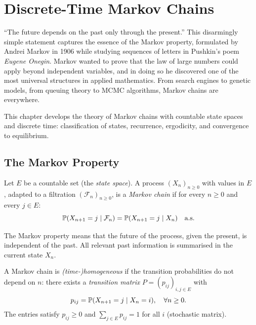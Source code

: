 \chapter{Discrete-Time Markov Chains}
\label{ch:discrete_markov}

``The future depends on the past only through the present.'' This disarmingly simple statement captures the essence of the Markov property, formulated by Andrei Markov in 1906 while studying sequences of letters in Pushkin's poem \emph{Eugene Onegin}. Markov wanted to prove that the law of large numbers could apply beyond independent variables, and in doing so he discovered one of the most universal structures in applied mathematics. From search engines to genetic models, from queuing theory to MCMC algorithms, Markov chains are everywhere.

This chapter develops the theory of Markov chains with countable state spaces and discrete time: classification of states, recurrence, ergodicity, and convergence to equilibrium.

\section{The Markov Property}

\begin{definition}
Let $E$ be a countable set (the \emph{state space}). A process $(X_n)_{n \geq 0}$
with values in $E$, adapted to a filtration $(\mathcal{F}_n)_{n \geq 0}$, is a
\emph{Markov chain} if for every $n \geq 0$ and every $j \in E$:
\[
  \mathbb{P}(X_{n+1} = j \mid \mathcal{F}_n) = \mathbb{P}(X_{n+1} = j \mid X_n) \quad \text{a.s.}
\]
\end{definition}

\begin{intuition}[title=\textbf{Memorylessness}]
The Markov property means that the future of the process, given the present, is
independent of the past. All relevant past information is summarised in the
current state $X_n$.
\end{intuition}

\begin{definition}
A Markov chain is \emph{(time-)homogeneous} if the transition probabilities do
not depend on $n$: there exists a \emph{transition matrix} $P = (p_{ij})_{i,j \in E}$
with
\[
  p_{ij} = \mathbb{P}(X_{n+1} = j \mid X_n = i), \quad \forall n \geq 0.
\]
The entries satisfy $p_{ij} \geq 0$ and $\sum_{j \in E} p_{ij} = 1$ for all $i$
(stochastic matrix).
\end{definition}

